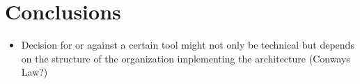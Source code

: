 \section{Conclusions}

\begin{itemize}
\item Decision for or against a certain tool might not only be technical but depends on the structure of the organization implementing the architecture (Conways Law?)
\end{itemize}

